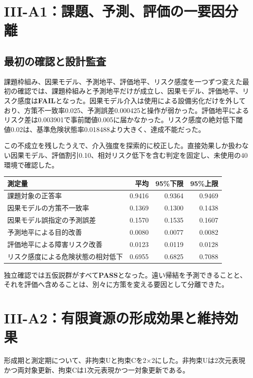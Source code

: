 \documentclass[11pt,a4paper]{ltjsarticle}
\newcommand{\PASS}{\textcolor{pass}{\textbf{PASS}}}
\newcommand{\FAIL}{\textcolor{red!65!black}{\textbf{FAIL}}}
\begin{document}
\section{III-A1：課題、予測、評価の一要因分離}

\subsection{最初の確認と設計監査}

課題枠組み、因果モデル、予測地平、評価地平、リスク感度を一つずつ変えた最初の確認では、課題枠組みと予測地平だけが成立し、因果モデル、評価地平、リスク感度は\FAIL となった。因果モデル介入は使用による設備劣化だけを外しており、方策不一致率0.025、予測誤差0.000425と操作が弱かった。評価地平によるリスク差は0.003901で事前閾値0.005に届かなかった。リスク感度の絶対低下閾値0.02は、基準危険状態率0.018488より大きく、達成不能だった。

この不成立を残したうえで、介入強度を探索的に校正した。直接効果しか扱わない因果モデル、評価割引0.10、相対リスク低下を含む判定を固定し、未使用の40環境で確認した。

\begin{center}\small
\begin{tabularx}{0.94\textwidth}{Xrrr}
\toprule
測定量 & 平均 & 95\%下限 & 95\%上限\\\midrule
課題対象の正答率 & 0.9416 & 0.9364 & 0.9469\\
因果モデルの方策不一致率 & 0.1369 & 0.1300 & 0.1438\\
因果モデル誤指定の予測誤差 & 0.1570 & 0.1535 & 0.1607\\
予測地平による目的改善 & 0.0080 & 0.0077 & 0.0082\\
評価地平による障害リスク改善 & 0.0123 & 0.0119 & 0.0128\\
リスク感度による危険状態の相対低下 & 0.6955 & 0.6825 & 0.7088\\\bottomrule
\end{tabularx}
\end{center}

独立確認では五仮説群がすべて\PASS となった。遠い帰結を予測できることと、それを評価へ含めることは、別々に方策を変える要因として分離できた。

\section{III-A2：有限資源の形成効果と維持効果}

形成期と測定期について、非拘束Uと拘束Cを2$\times$2にした。非拘束Uは2次元表現かつ両対象更新、拘束Cは1次元表現かつ一対象更新である。
\end{document}
